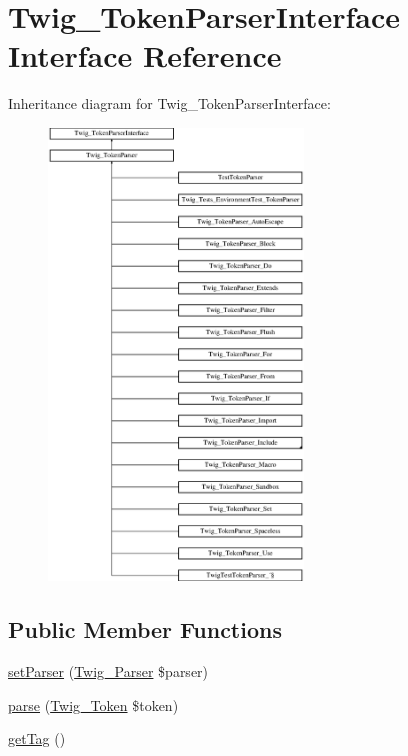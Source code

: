 \hypertarget{interfaceTwig__TokenParserInterface}{}\section{Twig\+\_\+\+Token\+Parser\+Interface Interface Reference}
\label{interfaceTwig__TokenParserInterface}
Inheritance diagram for Twig\+\_\+\+Token\+Parser\+Interface\+:\begin{figure}[H]
\begin{center}
\leavevmode
\includegraphics[height=12.000000cm]{interfaceTwig__TokenParserInterface}
\end{center}
\end{figure}
\subsection*{Public Member Functions}
\begin{DoxyCompactItemize}
\item 
\hyperlink{interfaceTwig__TokenParserInterface_aff673a64dc2aca11058702501abe308f}{set\+Parser} (\hyperlink{classTwig__Parser}{Twig\+\_\+\+Parser} \$parser)
\item 
\hyperlink{interfaceTwig__TokenParserInterface_a9d003ebcca4a13c6f36b86e79815e823}{parse} (\hyperlink{classTwig__Token}{Twig\+\_\+\+Token} \$token)
\item 
\hyperlink{interfaceTwig__TokenParserInterface_af87b3d6fc8f8950885ab2be75c8f039c}{get\+Tag} ()
\end{DoxyCompactItemize}



